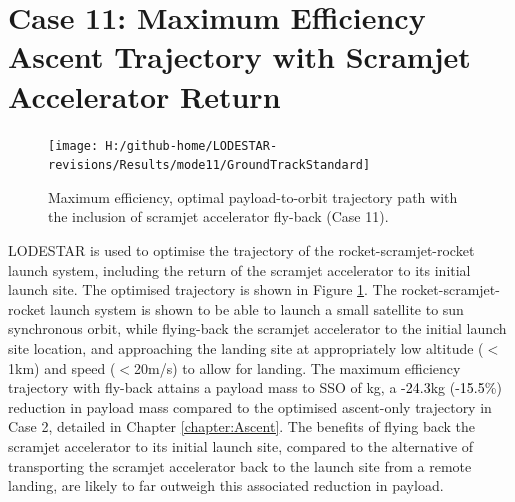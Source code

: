 \section{Case 11: Maximum Efficiency Ascent Trajectory with Scramjet Accelerator Return}\label{sec:case11}
\begin{figure}[ht]%
	\centering
	\texttt{[image: H:/github-home/LODESTAR-revisions/Results/mode11/GroundTrackStandard]}
	\caption{Maximum efficiency, optimal payload-to-orbit trajectory path with the inclusion of scramjet accelerator fly-back (Case 11). } %
	\label{fig:GroundTrackStandard}
\end{figure}
\noindent
LODESTAR is used to optimise the trajectory of the rocket-scramjet-rocket launch system, including the return of the scramjet accelerator to its initial launch site. The optimised trajectory is shown in Figure \ref{fig:GroundTrackStandard}. 
The rocket-scramjet-rocket launch system is shown to be able to launch a small satellite to sun synchronous orbit, 
while flying-back the scramjet accelerator to the initial launch site location, and approaching the landing site at appropriately low altitude ($<$1km) and speed ($<$20m/s) to allow for landing. 
The maximum efficiency trajectory with fly-back attains a payload mass to SSO of \PayloadToOrbitStandard kg, a \textcolor{black}{-24.3}kg (\textcolor{black}{-15.5}\%) reduction in payload mass compared to the optimised ascent-only trajectory in Case 2, detailed in Chapter \ref{chapter:Ascent}. 
The benefits of flying back the scramjet accelerator to its initial launch site, compared to the alternative of transporting the scramjet accelerator back to the launch site from a remote landing, are likely to far outweigh this associated reduction in payload. 
